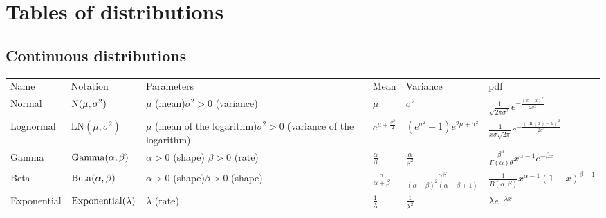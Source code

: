 \documentclass[thesis.tex]{subfiles}
\begin{document}
\chapter{Tables of distributions}
\begin{landscape}
\section{Continuous distributions}
\begin{tabular}{llp{3.5cm}lll}
Name & Notation & Parameters & Mean & Variance & pdf\\
Normal & $\operatorname{N}(\mu, \sigma^2)$ & $\mu$ (mean)\newline $\sigma^2 > 0$ (variance) & $\mu$ & $\sigma^2$ & $\frac{1}{\sqrt{2\pi\sigma^2}}e^{-\frac{(x-\mu)^2}{2\sigma^2}}$ \\
Lognormal & $\text{LN}(\mu, \sigma^2)$ & $\mu$ (mean of the logarithm)\newline $\sigma^2 > 0$ (variance of the logarithm) & $e^{\mu + \frac{\sigma^2}{2}}$ & $(e^{\sigma^2} - 1)e^{2\mu + \sigma^2}$ & $\frac{1}{x\sigma\sqrt{2\pi}}e^{-\frac{(\ln(x)-\mu)^2}{2\sigma^2}}$ \\
Gamma & $\operatorname{Gamma}(\alpha, \beta)$ & $\alpha > 0$ (shape) \newline $\beta > 0$ (rate) & $\frac{\alpha}{\beta}$ & $\frac{\alpha}{\beta^2}$ & $\frac{\beta^\alpha}{\Gamma(\alpha)\theta}x^{\alpha-1}e^{-\beta x}$ \\
Beta & $\operatorname{Beta}(\alpha, \beta)$ & $\alpha > 0$ (shape)\newline $\beta > 0$ (shape) & $\frac{\alpha}{\alpha+\beta}$ & $\frac{\alpha\beta}{(\alpha+\beta)^2(\alpha+\beta+1)}$ & $\frac{1}{B(\alpha,\beta)}x^{\alpha-1}(1-x)^{\beta-1}$ \\
Exponential & $\operatorname{Exponential}(\lambda)$ & $\lambda$ (rate) & $\frac{1}{\lambda}$ & $\frac{1}{\lambda^2}$ & $\lambda e^{-\lambda x}$ \\
\end{tabular}


\end{landscape}
\end{document}
